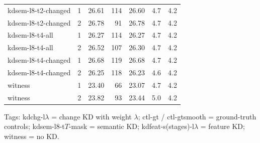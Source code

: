 \begin{table}[!t]
\begin{tabular}{lrrrrrr}
kdsem-l8-t2-changed & 1 & 26.61 & 114 & 26.60 & 4.7 & 4.2 \\
kdsem-l8-t2-changed & 2 & 26.78 & 91 & 26.78 & 4.7 & 4.2 \\
kdsem-l8-t4-all & 1 & 26.27 & 114 & 26.27 & 4.7 & 4.2 \\
kdsem-l8-t4-all & 2 & 26.52 & 107 & 26.30 & 4.7 & 4.2 \\
kdsem-l8-t4-changed & 1 & 26.68 & 119 & 26.68 & 4.7 & 4.2 \\
kdsem-l8-t4-changed & 2 & 26.25 & 118 & 26.23 & 4.6 & 4.2 \\
witness & 1 & 23.40 & 66 & 23.07 & 4.7 & 4.2 \\
witness & 2 & 23.82 & 93 & 23.44 & 5.0 & 4.2 \\
\bottomrule
\end{tabular}
\par\smallskip\parbox{\linewidth}{\scriptsize Tags: kdchg-l$\lambda$ = change KD with weight $\lambda$; ctl-gt / ctl-gtsmooth = ground-truth controls; kdsem-l8-t$T$-mask = semantic KD; kdfeat-s(stages)-l$\lambda$ = feature KD; witness = no KD.}
\end{table}
